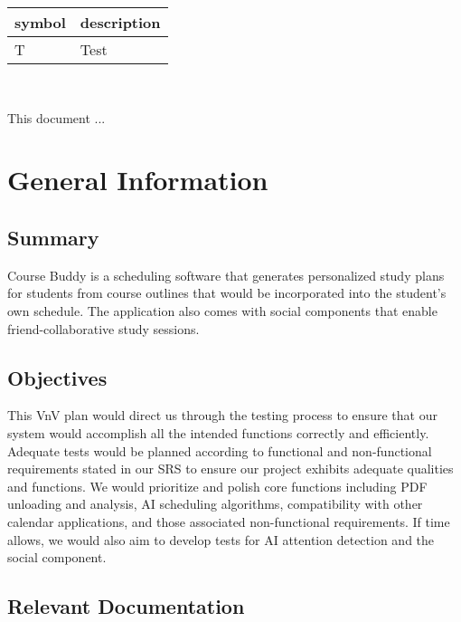 \documentclass[12pt, titlepage]{article}
\begin{document}
\renewcommand{\arraystretch}{1.2}
\begin{tabular}{l l} 
  \toprule		
  \textbf{symbol} & \textbf{description}\\
  \midrule 
  T & Test\\
  \bottomrule
\end{tabular}\\



\newpage


This document ... 

\section{General Information}

\subsection{Summary}
Course Buddy is a scheduling software that generates personalized study plans for students from course outlines that would be incorporated into the student's own schedule.  The application also comes with social components that enable friend-collaborative study sessions.

\subsection{Objectives}
This VnV plan would direct us through the testing process to ensure that our system would accomplish all the intended functions correctly and efficiently.  
Adequate tests would be planned according to functional and non-functional requirements stated in our SRS to ensure our project exhibits adequate qualities and functions.
We would prioritize and polish core functions including PDF unloading and analysis, AI scheduling algorithms, compatibility with other calendar applications, and those associated non-functional requirements. If time allows, we would also aim to develop tests for AI attention detection and the social component.


\subsection{Relevant Documentation}
\end{document}
